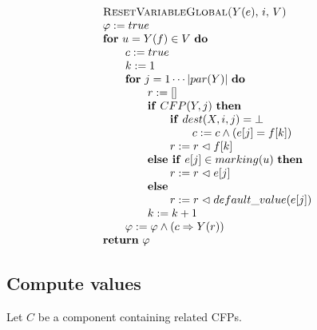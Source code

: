 \begin{equation*}
\begin{tabular}{l}
\textsc{ResetVariableGlobal(}$Y(e)$, $i,$ $V$\textsc{)} \\ 
$\varphi :=true$ \\ 
\textbf{for} $u=Y(f)\in V$ \textbf{do} \\ 
$\qquad c:=true$ \\ 
$\qquad k:=1$ \\ 
$\qquad $\textbf{for} $j=1\cdots \left\vert par(Y)\right\vert $ \textbf{do}
\\ 
$\qquad \qquad r:=[]$ \\ 
$\qquad \qquad $\textbf{if} $CFP(Y,j)$ \textbf{then} \\ 
$\qquad \qquad \qquad $\textbf{if} $dest(X,i,j)=\bot $ \\ 
$\qquad \qquad \qquad \qquad c:=c\wedge (e[j]=f[k])$ \\ 
$\qquad \qquad \qquad r:=r\vartriangleleft f[k]$ \\ 
$\qquad \qquad $\textbf{else if} $e[j]\in marking(u)$ \textbf{then} \\ 
$\qquad \qquad \qquad r:=r\vartriangleleft e[j]$ \\ 
$\qquad \qquad $\textbf{else} \\ 
$\qquad \qquad \qquad r:=r\vartriangleleft default\_value(e[j])$ \\ 
$\qquad \qquad k:=k+1$ \\ 
$\qquad \varphi :=\varphi \wedge (c\Rightarrow Y(r))$ \\ 
\textbf{return} $\varphi $%
\end{tabular}%
\end{equation*}

\newpage

\subsection{Compute values}

Let $C$ be a component containing related CFPs.

